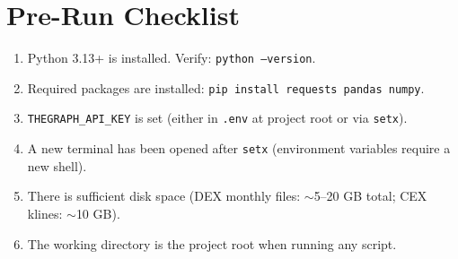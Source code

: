\documentclass[11pt,a4paper]{article}
\begin{document}
\section{Pre-Run Checklist}

\begin{enumerate}
    \item Python 3.13+ is installed. Verify: \texttt{python --version}.
    \item Required packages are installed: \texttt{pip install requests pandas numpy}.
    \item \texttt{THEGRAPH\_API\_KEY} is set (either in \texttt{.env} at project root or via \texttt{setx}).
    \item A new terminal has been opened after \texttt{setx} (environment variables require a new shell).
    \item There is sufficient disk space (DEX monthly files: $\sim$5--20 GB total; CEX klines: $\sim$10 GB).
    \item The working directory is the project root when running any script.
\end{enumerate}
\end{document}
